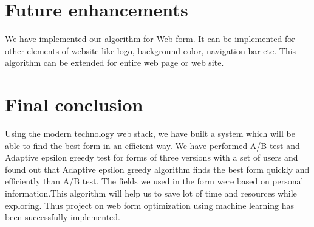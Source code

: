 \documentclass[12pt]{report}
\begin{document}
\section{Future enhancements}
We have implemented our algorithm for Web form. It can be implemented for other elements of website like logo, background color, navigation bar etc. This algorithm can be extended for entire web page or web site.

\section{Final conclusion}
Using the modern technology web stack, we have built a system which will be able to find the best form in an efficient way. We have performed A/B test and Adaptive epsilon greedy test for forms of three versions with a set of users and found out that Adaptive epsilon greedy algorithm finds the best form quickly and efficiently than A/B test. The fields we used in the form were based on personal information.This algorithm will help us to save lot of time and resources while exploring. Thus project on web form optimization using machine learning has been successfully implemented.
\newpage


\vspace*{40px}
\end{document}
